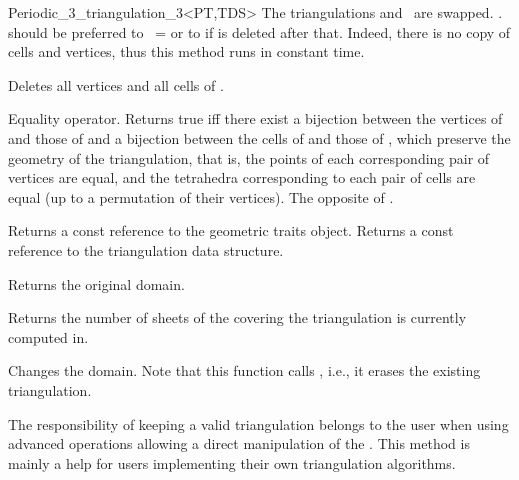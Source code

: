 \begin{ccRefClass}{Periodic_3_triangulation_3<PT,TDS>}
{The triangulations  and \ccVar\ are swapped.
\ccVar. should be preferred to \ccVar\ =  or to
 if  is deleted after that. Indeed, there is no
copy of cells and vertices, thus this method runs in constant time.}

{Deletes all vertices and all cells of \ccVar.}

{Equality operator.  Returns true iff there exist a bijection between the
vertices of  and those of  and a bijection between the cells of
 and those of , which preserve the geometry of the
triangulation, that is, the points of each corresponding pair of vertices are
equal, and the tetrahedra corresponding to each pair of cells are equal (up to
a permutation of their vertices).}
\ccGlue
{}
{The opposite of .}

\ccAccessFunctions


{Returns a const reference to the geometric traits object.}
\ccGlue
{}
{Returns a const reference to the triangulation data structure.}

{Returns the original domain.}

\begin{ccAdvanced}
{Returns the number of sheets of the covering the triangulation is
  currently computed in.} 

{Changes the domain. Note that this function calls ,
  i.e., it erases the existing triangulation. }

The responsibility of keeping a valid triangulation belongs to the user
when using advanced operations allowing a direct manipulation of the .
This method is mainly a help for users implementing their own triangulation
algorithms.


\end{ccAdvanced}
\end{ccRefClass}
